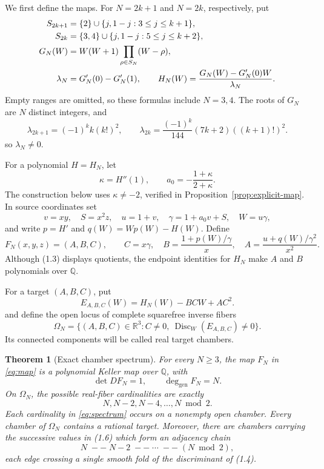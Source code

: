 \documentclass[11pt]{article}
\newtheorem{theorem}{Theorem}[section]
\newcommand{\R}{\mathbb R}
\newcommand{\Q}{\mathbb Q}
\newcommand{\Disc}{\operatorname{Disc}}
\numberwithin{equation}{section}
\begin{document}
We first define the maps.  For \(N=2k+1\) and \(N=2k\), respectively, put
\begin{align}
 S_{2k+1}
   &=\{2\}\cup\{j,1-j:3\leq j\leq k+1\}, \notag\\
 S_{2k}
   &=\{3,4\}\cup\{j,1-j:5\leq j\leq k+2\},\label{eq:seeds}\\
 G_N(W)&=W(W+1)\prod_{\rho\in S_N}(W-\rho),\notag\\
 \lambda_N&=G_N'(0)-G_N'(1),\qquad
 H_N(W)=\frac{G_N(W)-G_N'(0)W}{\lambda_N}.              \notag
\end{align}
Empty ranges are omitted, so these formulas include \(N=3,4\).  The roots
of \(G_N\) are \(N\) distinct integers, and
\begin{equation}
 \lambda_{2k+1}=(-1)^k k(k!)^2,\qquad
 \lambda_{2k}=\frac{(-1)^k}{144}(7k+2)((k+1)!)^2.
 \label{eq:lambda}
\end{equation}
so \(\lambda_N\neq0\).

For a polynomial \(H=H_N\), let
\[
 \kappa=H''(1),\qquad a_0=-\frac{1+\kappa}{2+\kappa}.
\]
The construction below uses \(\kappa\neq-2\), verified in
Proposition~\ref{prop:explicit-map}.  In source coordinates set
\[
 v=xy,\quad S=x^2z,\quad u=1+v,\quad
 \gamma=1+a_0v+S,\quad W=u\gamma,
\]
and write \(p=H'\) and \(q(W)=Wp(W)-H(W)\).  Define
\begin{equation}
 F_N(x,y,z)=(A,B,C),\qquad
 C=x\gamma,\quad
 B=\frac{1+p(W)/\gamma}{x},\quad
 A=\frac{u+q(W)/\gamma^2}{x^2}. \label{eq:map}
\end{equation}
Although (1.3) displays quotients, the endpoint identities for \(H_N\)
make \(A\) and \(B\) polynomials over \(\Q\).

For a target \((A,B,C)\), put
\begin{equation}
 E_{A,B,C}(W)=H_N(W)-BCW+AC^2. \label{eq:pencil}
\end{equation}
and define the open locus of complete squarefree inverse fibers
\begin{equation}
 \Omega_N=\{(A,B,C)\in\R^3:
 C\neq0,\ \Disc_W(E_{A,B,C})\neq0\}. \label{eq:omega}
\end{equation}
Its connected components will be called real target chambers.

\begin{theorem}[Exact chamber spectrum]\label{thm:spectrum}
For every \(N\geq3\), the map \(F_N\) in \emph{\eqref{eq:map}} is a polynomial Keller
map over \(\Q\), with
\[
 \det DF_N=1,\qquad \deg_{\mathrm{gen}}F_N=N.
\]
On \(\Omega_N\), the possible real-fiber cardinalities are exactly
\begin{equation}
 \boxed{N,N-2,N-4,\ldots,N\bmod2}. \label{eq:spectrum}
\end{equation}
Each cardinality in \emph{\eqref{eq:spectrum}} occurs on a nonempty open chamber.  Every
chamber of \(\Omega_N\) contains a rational target.  Moreover, there are
chambers carrying the successive values in \emph{(1.6)} which form an
adjacency chain
\[
 N\;--\;N-2\;--\;\cdots\;--\;(N\bmod2),
\]
each edge crossing a single smooth fold of the discriminant of
\emph{(1.4)}.
\end{theorem}
\end{document}
